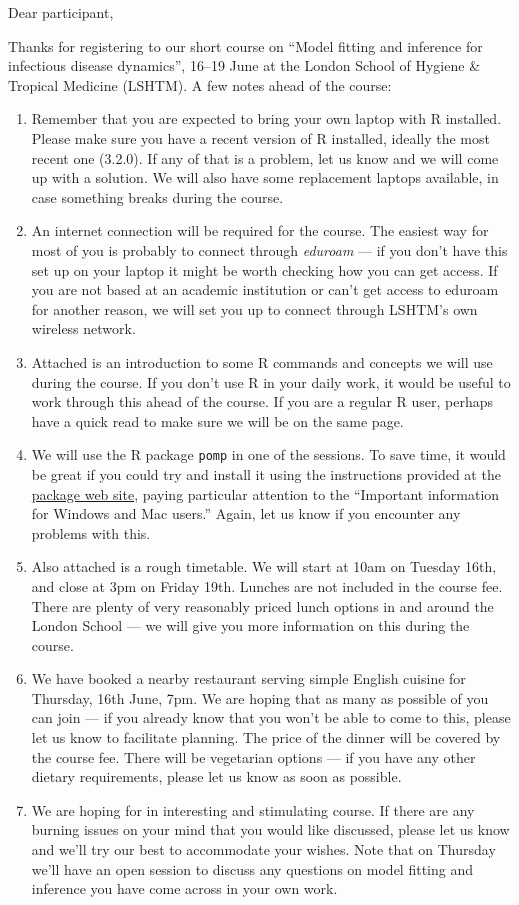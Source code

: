 \documentclass[paper=a4, 11pt]{scrlttr2}
\begin{document}
\begin{letter}{}
\opening{Dear participant,}
Thanks for registering to our short course on ``Model fitting and
inference for infectious disease dynamics'', 16--19 June at the London
School of Hygiene \& Tropical Medicine (LSHTM). A few notes ahead of
the course:

\begin{enumerate}
\item Remember that you are expected to bring your own laptop with R
installed. Please make sure you have a recent version of R installed,
ideally the most recent one (3.2.0). If any of that is a problem, let us know
and we will come up with a solution. We will also have some replacement laptops
available, in case something breaks during the course.
\item An internet connection will be required for the course. The easiest
way for most of you is probably to connect through \emph{eduroam} --- if you
don't have this set up on your laptop it might be worth checking how you
can get access. If you are not based at an academic institution or can't
get access to eduroam for another reason, we will set you up to connect
through LSHTM's own wireless network.
\item Attached is an introduction to some R commands and concepts
we will use during the course. If you don't use R in your daily work, it
would be useful to work through this ahead of the course. If you are a
regular R user, perhaps have a quick read to 
make sure we will be on the same page.
\item We will use the R package \texttt{pomp} in one of the
  sessions. To save time, it would be great if you could try and
  install it using the instructions provided at the 
  \href{http://pomp.r-forge.r-project.org/vignettes/getting_started.html#installing-the-package}{package web site},
  paying particular attention to the ``Important information for
  Windows and Mac users.'' Again, let us know if you encounter any
  problems with this.
\item Also attached is a rough timetable. We will start at 10am on Tuesday 16th,
and close at 3pm on Friday 19th. Lunches are not included in the
course fee. There are plenty of very reasonably priced lunch options in
and around the London School --- we will give you more information on
this during the course.
\item We have booked a nearby restaurant serving simple English cuisine for
Thursday, 16th June, 7pm. We are hoping that as many as possible of you
can join --- if you already know that you won't be able to come to this,
please let us know to facilitate planning. The price of the dinner will
be covered by the course fee. There will be vegetarian options --- if you
have any other dietary requirements, please let us know as soon as
possible.
\item We are hoping for in interesting and stimulating course. If there are
any burning issues on your mind that you would like discussed, please
let us know and we'll try our best to accommodate your wishes. Note
that on Thursday we'll have an open session to discuss any
questions on model fitting and inference you
have come across in your own work.  


\end{enumerate}
\end{letter}
\end{document}
